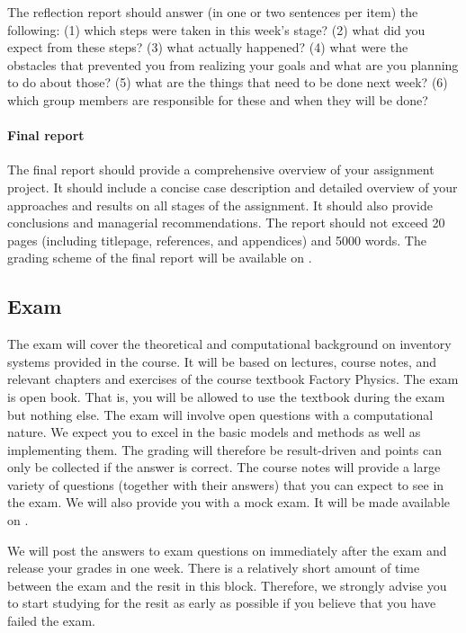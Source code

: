 \documentclass{article}
\begin{document}
The reflection report should answer (in one or two sentences per item) the following: (1) which steps were taken in this week's stage? (2) what did you expect from these steps? (3) what actually happened? (4) what were the obstacles that prevented you from realizing your goals and what are you planning to do about those? (5) what are the things that need to be done next week? (6) which group members are responsible for these and when they will be done? 

\paragraph{Final report}
\label{par:final}

The final report should provide a comprehensive overview of your assignment project. It should include a concise case description and detailed overview of your approaches and results on all stages of the assignment. It should also provide conclusions and managerial recommendations. The report should not exceed 20 pages (including titlepage, references, and appendices) and 5000 words. The grading scheme of the final report will be available on \nestor.

\subsection{Exam}
\label{sec:exam}

The exam will cover the theoretical and computational background on inventory systems provided in the course. It will be based on lectures, course notes, and relevant chapters and exercises of the course textbook Factory Physics. The exam is open book. That is, you will be allowed to use the textbook during the exam but nothing else. The exam will involve open questions with a computational nature. We expect you to excel in the basic models and methods as well as implementing them. The grading will therefore be result-driven and points can only be collected if the answer is correct. The course notes will provide a large variety of questions (together with their answers) that you can expect to see in the exam. We will also provide you with a mock exam. It will be made available on \nestor. 

We will post the answers to exam questions on \nestor immediately after the exam and release your grades in one week. There is a relatively short amount of time between the exam and the resit in this block. Therefore, we strongly advise you to start studying for the resit as early as possible if you believe that you have failed the exam.
\end{document}

